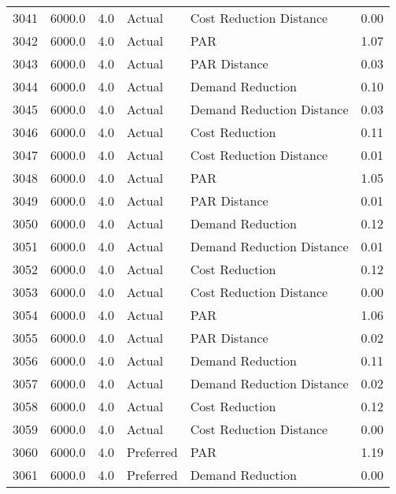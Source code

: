 \begin{longtable}{lrrllr}
3041 &       6000.0 &     4.0 &         Actual &    Cost Reduction Distance &   0.00 \\
3042 &       6000.0 &     4.0 &         Actual &                        PAR &   1.07 \\
3043 &       6000.0 &     4.0 &         Actual &               PAR Distance &   0.03 \\
3044 &       6000.0 &     4.0 &         Actual &           Demand Reduction &   0.10 \\
3045 &       6000.0 &     4.0 &         Actual &  Demand Reduction Distance &   0.03 \\
3046 &       6000.0 &     4.0 &         Actual &             Cost Reduction &   0.11 \\
3047 &       6000.0 &     4.0 &         Actual &    Cost Reduction Distance &   0.01 \\
3048 &       6000.0 &     4.0 &         Actual &                        PAR &   1.05 \\
3049 &       6000.0 &     4.0 &         Actual &               PAR Distance &   0.01 \\
3050 &       6000.0 &     4.0 &         Actual &           Demand Reduction &   0.12 \\
3051 &       6000.0 &     4.0 &         Actual &  Demand Reduction Distance &   0.01 \\
3052 &       6000.0 &     4.0 &         Actual &             Cost Reduction &   0.12 \\
3053 &       6000.0 &     4.0 &         Actual &    Cost Reduction Distance &   0.00 \\
3054 &       6000.0 &     4.0 &         Actual &                        PAR &   1.06 \\
3055 &       6000.0 &     4.0 &         Actual &               PAR Distance &   0.02 \\
3056 &       6000.0 &     4.0 &         Actual &           Demand Reduction &   0.11 \\
3057 &       6000.0 &     4.0 &         Actual &  Demand Reduction Distance &   0.02 \\
3058 &       6000.0 &     4.0 &         Actual &             Cost Reduction &   0.12 \\
3059 &       6000.0 &     4.0 &         Actual &    Cost Reduction Distance &   0.00 \\
3060 &       6000.0 &     4.0 &      Preferred &                        PAR &   1.19 \\
3061 &       6000.0 &     4.0 &      Preferred &           Demand Reduction &   0.00 \\

\end{longtable}
